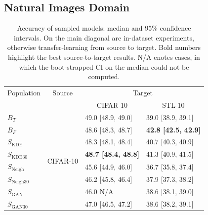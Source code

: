 \subsection{Natural Images Domain}
\begin{table}[ht!]
\begin{minipage}[t]{0.98\textwidth}
\centering
{\small
\caption{Accuracy of sampled models: median and 95\% confidence intervals. On the main diagonal are in-dataset experiments, otherwise transfer-learning from source to target. Bold numbers highlight the best source-to-target results. N/A enotes cases, in which the boot-strapped CI on the median could not be computed.}
\begin{tabularx}{0.6\linewidth}{lcll}
\toprule
Population           & Source                    & \multicolumn{2}{c}{Target}                                      \\
\cmidrule(rl){1-1} \cmidrule(rl){2-2}  \cmidrule(rl){3-4} 
                     & \multicolumn{1}{l}{}      & \multicolumn{1}{c}{CIFAR-10}   & \multicolumn{1}{c}{STL-10}     \\
 \cmidrule(rl){3-3} \cmidrule(rl){4-4}  
$B_T$                & \multirow{8}{*}{CIFAR-10} & 49.0 {[}48.9, 49.0{]}          & 39.0 {[}38.9, 39.1{]}          \\
\cmidrule(rl){1-1} \cmidrule(rl){2-2}  \cmidrule(rl){3-4} 
$B_F$                &                           & 48.6 {[}48.3, 48.7{]}          & \textbf{42.8 {[}42.5, 42.9{]}} \\
$S_{\text{KDE}}$     &                           & 48.3 {[}48.1, 48.4{]}          & 40.7 {[}40.3, 40.9{]}          \\
$S_{\text{KDE}30}$   &                           & \textbf{48.7 {[}48.4, 48.8{]}} & 41.3 {[}40.9, 41.5{]}          \\
$S_{\text{Neigh}}$   &                           & 45.6 {[}44.9, 46.0{]}          & 36.7 {[}35.8, 37.4{]}          \\
$S_{\text{Neigh}30}$ &                           & 46.2 {[}45.8, 46.4{]}          & 37.9 {[}37.3, 38.2{]}          \\
$S_{\text{GAN}}$     &                           & 46.0 N/A                       & 38.6 {[}38.1, 39.0{]}          \\
$S_{\text{GAN}30}$   &                           & 47.0 {[}46.5, 47.2{]}          & 38.6 {[}38.2, 39.1{]}          \\
\cmidrule(rl){1-1} \cmidrule(rl){2-2}  \cmidrule(rl){3-4} 

\end{tabularx}}
\end{minipage}
\end{table}
